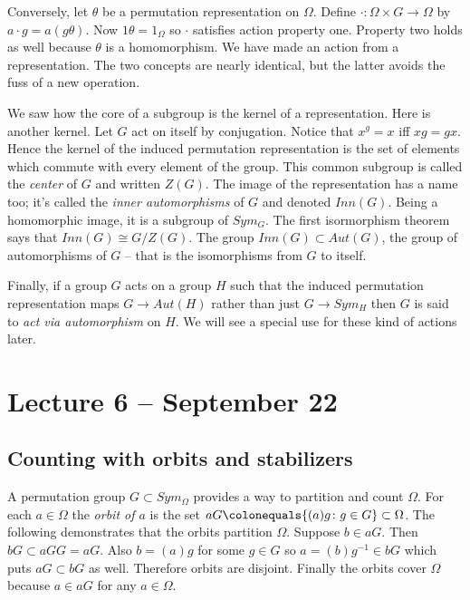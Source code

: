 \documentclass[letterpaper]{article}
\begin{document}
Conversely, let $\theta$ be a permutation representation on $\Omega$. Define $\cdot \colon \Omega \times G \rightarrow \Omega$ by $a \cdot g = a(g\theta)$. Now $1\theta = 1_\Omega$ so $\cdot$ satisfies action property one. Property two holds as well because $\theta$ is a homomorphism. We have made an action from a representation. The two concepts are nearly identical, but the latter avoids the fuss of a new operation.

We saw how the core of a subgroup is the kernel of a representation. Here is another kernel. Let $G$ act on itself by conjugation. Notice that $x^g = x$ iff $xg = gx$. Hence the kernel of the induced permutation representation is the set of elements which commute with every element of the group. This common subgroup is called the \emph{center} of $G$ and written $Z(G)$. The image of the representation has a name too; it's called the \emph{inner automorphisms} of $G$ and denoted $Inn(G)$. Being a homomorphic image, it is a subgroup of $Sym_G$. The first isormorphism theorem says that $Inn(G) \cong G/Z(G)$. The group $Inn(G) \subset Aut(G)$, the group of automorphisms of $G$ -- that is the isomorphisms from $G$ to itself.

Finally, if a group $G$ acts on a group $H$ such that the induced permutation representation maps $G \rightarrow Aut(H)$ rather than just $G \rightarrow Sym_H$ then $G$ is said to \emph{act via automorphism} on $H$. We will see a special use for these kind of actions later.

\section{Lecture 6 -- September 22}

\subsection{Counting with orbits and stabilizers}

A permutation group $G \subset Sym_\Omega$ provides a way to partition and count  $\Omega$. For each $a \in \Omega$ the \emph{orbit of $a$} is the set $aG \colonequals \{(a)g\colon g \in G\} \subset \Omega$. The following demonstrates that the orbits partition $\Omega$. Suppose $b \in aG$. Then $bG \subset aGG = aG$. Also $b = (a)g$ for some $g \in G$ so $a = (b)g^{-1} \in bG$ which puts $aG \subset bG$ as well. Therefore orbits are disjoint. Finally the orbits cover $\Omega$ because $a \in aG$ for any $a \in \Omega$.
\end{document}
